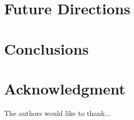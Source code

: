 \documentclass[10pt,conference]{IEEEtran}
\begin{document}
\section{Future Directions}\label{sec:future}

\section{Conclusions}\label{sec:conclusions}


\section*{Acknowledgment}

The authors would like to thank... \cite{simms2007}





\end{document}
